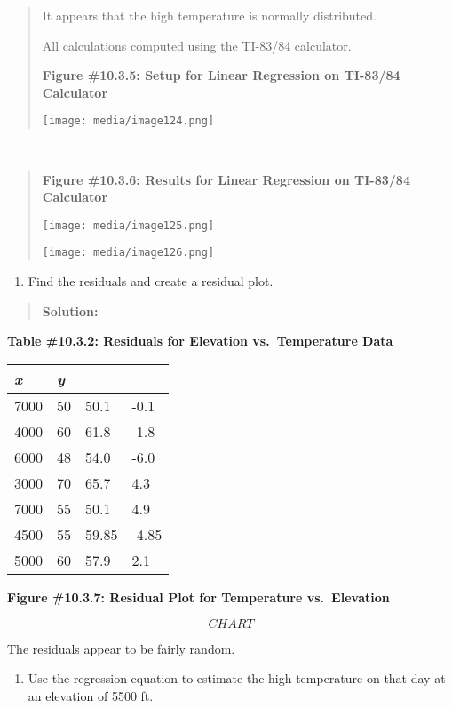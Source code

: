 \documentclass[]{book}
\providecommand{\tightlist}{%
  \setlength{\itemsep}{0pt}\setlength{\parskip}{0pt}}
\begin{document}
\begin{quote}
It appears that the high temperature is normally distributed.

All calculations computed using the TI-83/84 calculator.

\textbf{Figure \#10.3.5: Setup for Linear Regression on TI-83/84
Calculator}

\texttt{[image: media/image124.png]}
\end{quote}

\textbf{\\
}

\begin{quote}
\textbf{Figure \#10.3.6: Results for Linear Regression on TI-83/84
Calculator}

\texttt{[image: media/image125.png]}

\texttt{[image: media/image126.png]}
\end{quote}

\begin{enumerate}
\def\labelenumi{\alph{enumi}.}
\setcounter{enumi}{2}
\tightlist
\item
  Find the residuals and create a residual plot.
\end{enumerate}

\begin{quote}
\textbf{Solution:}
\end{quote}

\textbf{Table \#10.3.2: Residuals for Elevation vs.~Temperature Data}

\begin{longtable}[]{@{}llll@{}}
\toprule
\emph{x} & \emph{y} & &\tabularnewline
\midrule
\endhead
7000 & 50 & 50.1 & -0.1\tabularnewline
4000 & 60 & 61.8 & -1.8\tabularnewline
6000 & 48 & 54.0 & -6.0\tabularnewline
3000 & 70 & 65.7 & 4.3\tabularnewline
7000 & 55 & 50.1 & 4.9\tabularnewline
4500 & 55 & 59.85 & -4.85\tabularnewline
5000 & 60 & 57.9 & 2.1\tabularnewline
\bottomrule
\end{longtable}

\textbf{Figure \#10.3.7: Residual Plot for Temperature vs.~Elevation}

{\[CHART\]}

The residuals appear to be fairly random.

\begin{enumerate}
\def\labelenumi{\alph{enumi}.}
\setcounter{enumi}{3}
\tightlist
\item
  Use the regression equation to estimate the high temperature on that
  day at an elevation of 5500 ft.
\end{enumerate}
\end{document}
